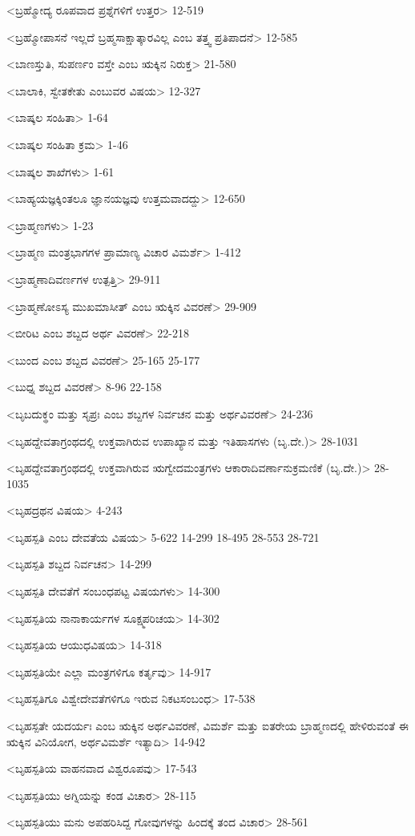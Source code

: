 <ಬ್ರಹ್ಮೋದ್ಯ ರೂಪವಾದ ಪ್ರಶ್ನೆಗಳಿಗೆ ಉತ್ತರ>
12-519

<ಬ್ರಹ್ಮೋಪಾಸನೆ ಇಲ್ಲದೆ ಬ್ರಹ್ಮಸಾಕ್ಷಾತ್ಕಾರವಿಲ್ಲ ಎಂಬ ತತ್ತ್ವ ಪ್ರತಿಪಾದನೆ>
12-585

<ಬಾಣಸ್ತುತಿ, ಸುಪರ್ಣಂ ವಸ್ತೇ ಎಂಬ ಋಕ್ಕಿನ ನಿರುಕ್ತ>
21-580

<ಬಾಲಾಕಿ, ಸ್ವೇತಕೇತು ಎಂಬುವರ ವಿಷಯ>
12-327

<ಬಾಷ್ಕಲ ಸಂಹಿತಾ>
1-64

<ಬಾಷ್ಕಲ ಸಂಹಿತಾ ಕ್ರಮ>
1-46

<ಬಾಷ್ಕಲ ಶಾಖೆಗಳು>
1-61

<ಬಾಹ್ಯಯಜ್ಞಕ್ಕಿಂತಲೂ ಜ್ಞಾನಯಜ್ಞವು ಉತ್ತಮವಾದದ್ದು>
12-650

<ಬ್ರಾಹ್ಮಣಗಳು>
1-23

<ಬ್ರಾಹ್ಮಣ ಮಂತ್ರಭಾಗಗಳ ಪ್ರಾಮಾಣ್ಯ ವಿಚಾರ ವಿಮರ್ಶೆ>
1-412

<ಬ್ರಾಹ್ಮಣಾದಿವರ್ಣಗಳ ಉತ್ಪತ್ತಿ>
29-911

<ಬ್ರಾಹ್ಮಣೋಽಸ್ಯ ಮುಖಮಾಸೀತ್‍ ಎಂಬ ಋಕ್ಕಿನ ವಿವರಣೆ>
29-909

<ಬೀರಿಟ ಎಂಬ ಶಬ್ದದ ಅರ್ಥ ವಿವರಣೆ>
22-218

<ಬುಂದ ಎಂಬ ಶಬ್ದದ ವಿವರಣೆ>
25-165
25-177

<ಬುಧ್ನ ಶಬ್ದದ ವಿವರಣೆ>
8-96
22-158

<ಬೃಬದುಕ್ಥಂ ಮತ್ತು ಸೃಪ್ರಃ ಎಂಬ ಶಬ್ದಗಳ ನಿರ್ವಚನ ಮತ್ತು ಅರ್ಥವಿವರಣೆ>
24-236

<ಬೃಹದ್ದೇವತಾಗ್ರಂಥದಲ್ಲಿ ಉಕ್ತವಾಗಿರುವ ಉಪಾಖ್ಯಾನ ಮತ್ತು ಇತಿಹಾಸಗಳು (ಬೃ.ದೇ.)>
28-1031

<ಬೃಹದ್ದೇವತಾಗ್ರಂಥದಲ್ಲಿ ಉಕ್ತವಾಗಿರುವ ಋಗ್ವೇದಮಂತ್ರಗಳು ಆಕಾರಾದಿವರ್ಣಾನುಕ್ರಮಣಿಕೆ (ಬೃ.ದೇ.)>
28-1035

<ಬೃಹದ್ರಥನ ವಿಷಯ>
4-243

<ಬೃಹಸ್ಪತಿ ಎಂಬ ದೇವತೆಯ ವಿಷಯ>
5-622 
14-299 
18-495 
28-553
28-721

<ಬೃಹಸ್ಪತಿ ಶಬ್ದದ ನಿರ್ವಚನ>
14-299

<ಬೃಹಸ್ಪತಿ ದೇವತೆಗೆ ಸಂಬಂಧಪಟ್ಟ ವಿಷಯಗಳು>
14-300

<ಬೃಹಸ್ಪತಿಯ ನಾನಾಕಾರ್ಯಗಳ ಸೂಕ್ಷ್ಮಪರಿಚಯ>
14-302

<ಬೃಹಸ್ಪತಿಯ ಆಯುಧವಿಷಯ>
14-318

<ಬೃಹಸ್ಪತಿಯೇ ಎಲ್ಲಾ ಮಂತ್ರಗಳಿಗೂ ಕರ್ತೃವು>
14-917

<ಬೃಹಸ್ಪತಿಗೂ ವಿಶ್ವೇದೇವತೆಗಳಿಗೂ ಇರುವ ನಿಕಟಸಂಬಂಧ>
17-538

<ಬೃಹಸ್ಪತೇ ಯದರ್ಯಃ ಎಂಬ ಋಕ್ಕಿನ ಅರ್ಥವಿವರಣೆ, ವಿಮರ್ಶೆ ಮತ್ತು ಐತರೇಯ ಬ್ರಾಹ್ಮಣದಲ್ಲಿ ಹೇಳಿರುವಂತೆ ಈ ಋಕ್ಕಿನ ವಿನಿಯೋಗ, ಅರ್ಥವಿಮರ್ಶೆ ಇತ್ಯಾದಿ>
14-942

<ಬೃಹಸ್ಪತಿಯ ವಾಹನವಾದ ವಿಶ್ವರೂಪವು>
17-543

<ಬೃಹಸ್ಪತಿಯು ಅಗ್ನಿಯನ್ನು ಕಂಡ ವಿಚಾರ>
28-115

<ಬೃಹಸ್ಪತಿಯು ಮನು ಅಪಹರಿಸಿದ್ದ ಗೋವುಗಳನ್ನು ಹಿಂದಕ್ಕೆ ತಂದ ವಿಚಾರ>
28-561

